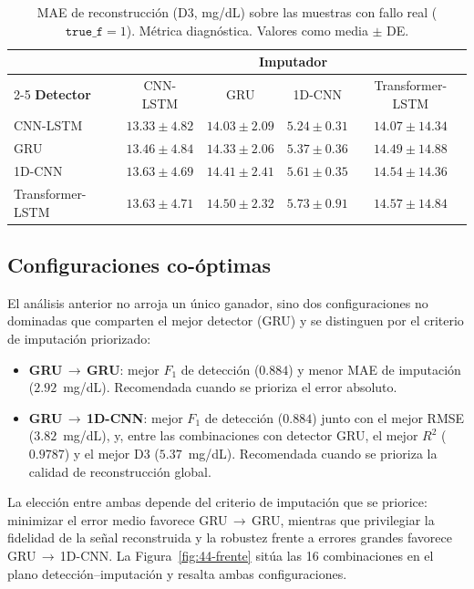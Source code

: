 \documentclass{report}
\begin{document}
\begin{table}[htbp]
\centering
\caption{MAE de reconstrucción (D3, mg/dL) sobre las muestras con fallo real ($\texttt{true\_f}=1$). Métrica diagnóstica. Valores como media $\pm$ DE.}
\label{tab:44-mae-d3}
\small
\begin{tabular}{lcccc}
\toprule
 & \multicolumn{4}{c}{\textbf{Imputador}} \\
\cmidrule(lr){2-5}
\textbf{Detector} & CNN-LSTM & GRU & 1D-CNN & Transformer-LSTM \\
\midrule
CNN-LSTM          & $13.33 \pm 4.82$ & $14.03 \pm 2.09$ & $5.24 \pm 0.31$ & $14.07 \pm 14.34$ \\
GRU               & $13.46 \pm 4.84$ & $14.33 \pm 2.06$ & $5.37 \pm 0.36$ & $14.49 \pm 14.88$ \\
1D-CNN            & $13.63 \pm 4.69$ & $14.41 \pm 2.41$ & $5.61 \pm 0.35$ & $14.54 \pm 14.36$ \\
Transformer-LSTM  & $13.63 \pm 4.71$ & $14.50 \pm 2.32$ & $5.73 \pm 0.91$ & $14.57 \pm 14.84$ \\
\bottomrule
\end{tabular}
\end{table}

\subsection{Configuraciones co-óptimas}
\label{subsec:co-optimas}

El análisis anterior no arroja un único ganador, sino dos configuraciones no dominadas que comparten el mejor detector (GRU) y se distinguen por el criterio de imputación priorizado:

\begin{itemize}
  \item \textbf{GRU\,$\rightarrow$\,GRU}: mejor $F_1$ de detección ($0.884$) y menor MAE de imputación ($2.92$~mg/dL). Recomendada cuando se prioriza el error absoluto.
  \item \textbf{GRU\,$\rightarrow$\,1D-CNN}: mejor $F_1$ de detección ($0.884$) junto con el mejor RMSE ($3.82$~mg/dL), y, entre las combinaciones con detector GRU, el mejor $R^2$ ($0.9787$) y el mejor D3 ($5.37$~mg/dL). Recomendada cuando se prioriza la calidad de reconstrucción global.
\end{itemize}

La elección entre ambas depende del criterio de imputación que se priorice: minimizar el error medio favorece GRU\,$\rightarrow$\,GRU, mientras que privilegiar la fidelidad de la señal reconstruida y la robustez frente a errores grandes favorece GRU\,$\rightarrow$\,1D-CNN. La Figura~\ref{fig:44-frente} sitúa las 16 combinaciones en el plano detección–imputación y resalta ambas configuraciones.
\end{document}
